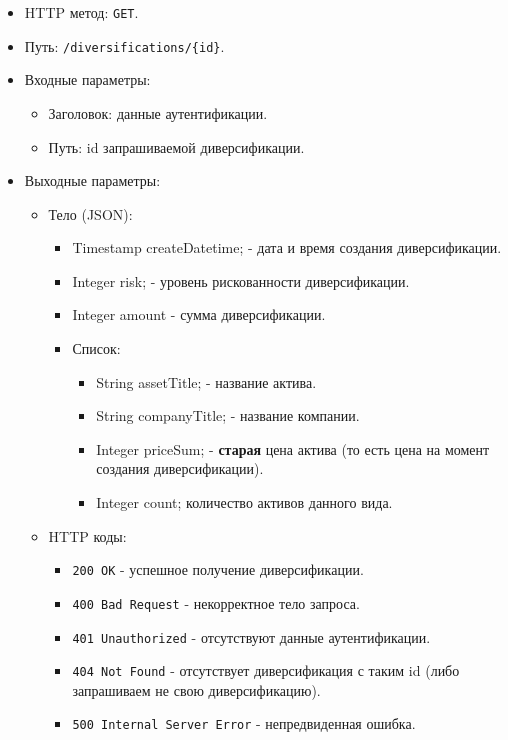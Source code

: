 \documentclass[a4paper, 14pt]{article}
\begin{document}
\begin{itemize}
    \item HTTP метод: \texttt{GET}.
    \item Путь: \texttt{/diversifications/\{id\}}.
    \item Входные параметры:
    \begin{itemize}
        \item Заголовок: данные аутентификации.
        \item Путь: id запрашиваемой диверсификации.
    \end{itemize}
    \item Выходные параметры:
    \begin{itemize}
        \item Тело (JSON):
        \begin{itemize}
            \item Timestamp createDatetime; - дата и время создания диверсификации.
            \item Integer risk; - уровень рискованности диверсификации.
            \item Integer amount - сумма диверсификации.
            \item Список:
            \begin{itemize}
                \item String assetTitle; - название актива.
                \item String companyTitle; - название компании.
                \item Integer priceSum; - \textbf{старая} цена актива (то есть цена на момент создания диверсификации).
                \item Integer count; количество активов данного вида.
            \end{itemize}
        \end{itemize}
        \item HTTP коды:
        \begin{itemize}
            \item \texttt{200 OK} - успешное получение диверсификации.
            \item \texttt{400 Bad Request} - некорректное тело запроса.
            \item \texttt{401 Unauthorized} - отсутствуют данные аутентификации.
            \item \texttt{404 Not Found} - отсутствует диверсификация с таким id (либо запрашиваем не свою диверсификацию).
            \item \texttt{500 Internal Server Error} - непредвиденная ошибка.
        \end{itemize}
    \end{itemize}
\end{itemize}
\end{document}

